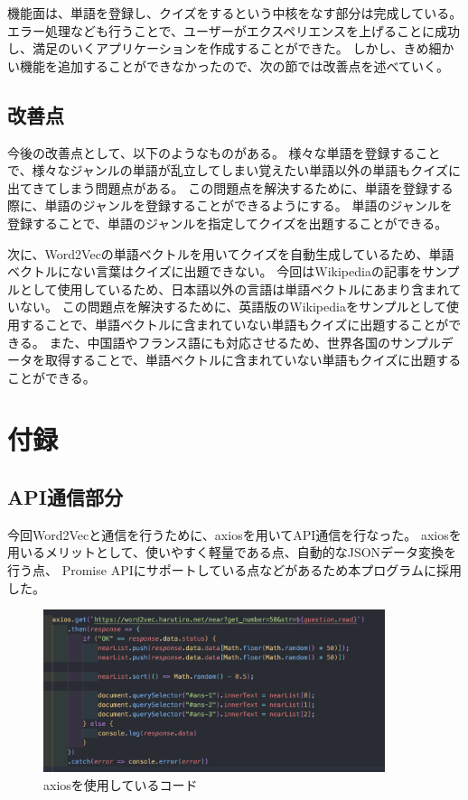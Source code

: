 \documentclass[11pt,a4paper]{jsarticle}
\begin{document}
機能面は、単語を登録し、クイズをするという中核をなす部分は完成している。
エラー処理なども行うことで、ユーザーがエクスペリエンスを上げることに成功し、満足のいくアプリケーションを作成することができた。
しかし、きめ細かい機能を追加することができなかったので、次の節では改善点を述べていく。


\subsection{改善点}
今後の改善点として、以下のようなものがある。
様々な単語を登録することで、様々なジャンルの単語が乱立してしまい覚えたい単語以外の単語もクイズに出てきてしまう問題点がある。
この問題点を解決するために、単語を登録する際に、単語のジャンルを登録することができるようにする。
単語のジャンルを登録することで、単語のジャンルを指定してクイズを出題することができる。

次に、Word2Vecの単語ベクトルを用いてクイズを自動生成しているため、単語ベクトルにない言葉はクイズに出題できない。
今回はWikipediaの記事をサンプルとして使用しているため、日本語以外の言語は単語ベクトルにあまり含まれていない。
この問題点を解決するために、英語版のWikipediaをサンプルとして使用することで、単語ベクトルに含まれていない単語もクイズに出題することができる。
また、中国語やフランス語にも対応させるため、世界各国のサンプルデータを取得することで、単語ベクトルに含まれていない単語もクイズに出題することができる。

\section{付録}

\subsection{API通信部分}

今回Word2Vecと通信を行うために、axiosを用いてAPI通信を行なった。
axiosを用いるメリットとして、使いやすく軽量である点、自動的なJSONデータ変換を行う点、
Promise APIにサポートしている点などがあるため本プログラムに採用した。


\begin{figure}[htbp]
    \begin{center}
        \includegraphics[width=100mm]{./img/axios.png}
    \end{center}
    \caption{axiosを使用しているコード}
\end{figure}
\end{document}
